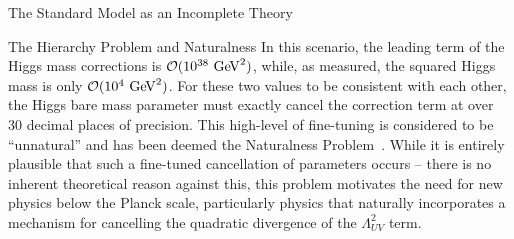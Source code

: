 \begin{section}{The Standard Model as an Incomplete Theory}
\begin{subsection}{The Hierarchy Problem and Naturalness}
In this scenario, the leading term of the Higgs mass corrections is $\mathcal{O}(10^{38}~\mathrm{Ge\kern -0.1em V}^2)$, while, as measured, the squared Higgs mass is only $\mathcal{O}(10^{4}~\mathrm{Ge\kern -0.1em V}^2)$.
For these two values to be consistent with each other, the Higgs bare mass parameter must exactly cancel the correction term at over 30 decimal places of precision.
This high-level of fine-tuning is considered to be ``unnatural'' and has been deemed the Naturalness Problem~\cite{Feng:2013pwa,Craig:2013cxa,Papucci:2011wy,Casas:2014eca}.
While it is entirely plausible that such a fine-tuned cancellation of parameters occurs -- there is no inherent theoretical reason against this, this problem motivates the need for new physics below the Planck scale, particularly physics that naturally incorporates a mechanism for cancelling the quadratic divergence of the $\Lambda_{UV}^2$ term.

\end{subsection}

\end{section}


